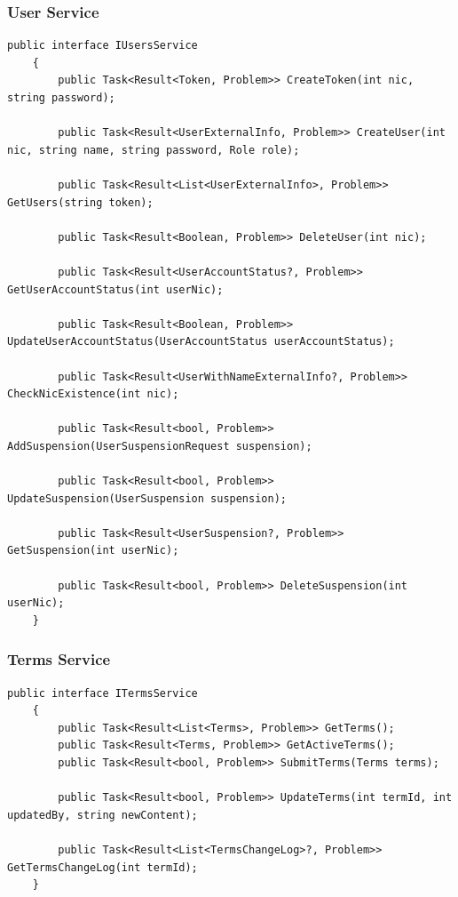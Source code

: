 \subsubsection{User Service}

\begin{lstlisting}[style=sharpc]
	public interface IUsersService
	{
		public Task<Result<Token, Problem>> CreateToken(int nic, string password);
		
		public Task<Result<UserExternalInfo, Problem>> CreateUser(int nic, string name, string password, Role role);
		
		public Task<Result<List<UserExternalInfo>, Problem>> GetUsers(string token);
		
		public Task<Result<Boolean, Problem>> DeleteUser(int nic);
		
		public Task<Result<UserAccountStatus?, Problem>> GetUserAccountStatus(int userNic);
		
		public Task<Result<Boolean, Problem>> UpdateUserAccountStatus(UserAccountStatus userAccountStatus);
		
		public Task<Result<UserWithNameExternalInfo?, Problem>> CheckNicExistence(int nic);
		
		public Task<Result<bool, Problem>> AddSuspension(UserSuspensionRequest suspension);
		
		public Task<Result<bool, Problem>> UpdateSuspension(UserSuspension suspension);
		
		public Task<Result<UserSuspension?, Problem>> GetSuspension(int userNic);
		
		public Task<Result<bool, Problem>> DeleteSuspension(int userNic);
	}
\end{lstlisting}

\newpage

\subsubsection{Terms Service}

\begin{lstlisting}[style=sharpc]
	public interface ITermsService
	{
		public Task<Result<List<Terms>, Problem>> GetTerms();
		public Task<Result<Terms, Problem>> GetActiveTerms();
		public Task<Result<bool, Problem>> SubmitTerms(Terms terms);
		
		public Task<Result<bool, Problem>> UpdateTerms(int termId, int updatedBy, string newContent);
		
		public Task<Result<List<TermsChangeLog>?, Problem>> GetTermsChangeLog(int termId);
	}
\end{lstlisting}


